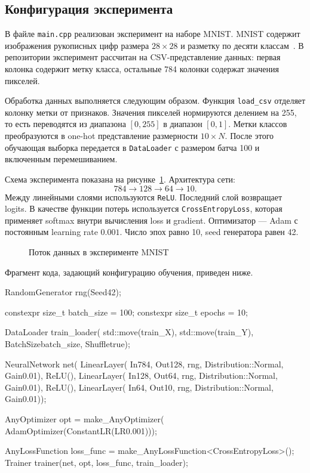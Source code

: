 \documentclass{article}
\begin{document}
\subsection{Конфигурация эксперимента}

В файле \texttt{main.cpp} реализован эксперимент на наборе MNIST.
MNIST содержит изображения рукописных цифр размера $28 \times 28$ и
разметку по десяти классам~\cite{lecun1998gradient}. В репозитории
эксперимент рассчитан на CSV-представление данных: первая колонка
содержит метку класса, остальные 784 колонки содержат значения
пикселей.

Обработка данных выполняется следующим образом. Функция
\texttt{load\_csv} отделяет колонку метки от признаков. Значения
пикселей нормируются делением на 255, то есть переводятся из диапазона
$[0,255]$ в диапазон $[0,1]$. Метки классов преобразуются в one-hot
представление размерности $10 \times N$. После этого обучающая выборка
передается в \texttt{DataLoader} с размером батча 100 и включенным
перемешиванием.

Схема эксперимента показана на рисунке~\ref{fig:mnist}. Архитектура
сети:
\[
    784 \rightarrow 128 \rightarrow 64 \rightarrow 10.
\]
Между линейными слоями используются \texttt{ReLU}. Последний слой
возвращает logits. В качестве функции потерь используется
\texttt{CrossEntropyLoss}, которая применяет softmax внутри вычисления
loss и gradient. Оптимизатор --- Adam с постоянным learning rate
$0.001$. Число эпох равно 10, seed генератора равен 42.

\begin{figure}[!t]
    \centering
    
    \caption{Поток данных в эксперименте MNIST}
    \label{fig:mnist}
\end{figure}

Фрагмент кода, задающий конфигурацию обучения, приведен ниже.
\begin{cppcode}
RandomGenerator rng(Seed{42});

constexpr size_t batch_size = 100;
constexpr size_t epochs = 10;

DataLoader train_loader(
    std::move(train_X),
    std::move(train_Y),
    BatchSize{batch_size},
    Shuffle{true});

NeuralNetwork net(
    LinearLayer(
        In{784},
        Out{128},
        rng,
        Distribution::Normal,
        Gain{0.01}),
    ReLU(),
    LinearLayer(
        In{128},
        Out{64},
        rng,
        Distribution::Normal,
        Gain{0.01}),
    ReLU(),
    LinearLayer(
        In{64},
        Out{10},
        rng,
        Distribution::Normal,
        Gain{0.01}));

AnyOptimizer opt = make_AnyOptimizer(
    AdamOptimizer(ConstantLR(LR{0.001})));

AnyLossFunction loss_func = make_AnyLossFunction<CrossEntropyLoss>();
Trainer trainer(net, opt, loss_func, train_loader);
\end{cppcode}
\end{document}
